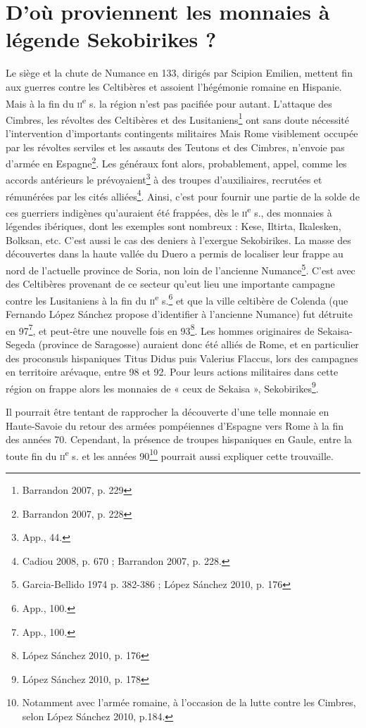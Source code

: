 \documentclass[a4paper,11pt]{article}
\begin{document}
\pagestyle{empty}
\section*{D’où proviennent les monnaies à légende Sekobirikes ?}

Le siège et la chute de Numance en 133, dirigés par Scipion Emilien, mettent fin aux guerres contre 
les Celtibères et assoient l’hégémonie romaine en Hispanie. Mais à la 
fin du \textsc{ii}\textsuperscript{e} s. la région n’est pas pacifiée pour autant.
L’attaque des Cimbres, les révoltes des Celtibères et des Lusitaniens\footnote{Barrandon 2007, p. 229} ont
sans doute nécessité l’intervention d’importants contingents militaires	
Mais Rome visiblement occupée par les révoltes serviles et les assauts des Teutons
et des Cimbres, n’envoie pas d’armée en Espagne\footnote{Barrandon 2007, p. 228}.
Les généraux font alors, probablement, appel, comme les accords antérieurs le prévoyaient\footnote{App., 44.}
à des troupes d’auxiliaires, recrutées et rémunérées par les cités alliées\footnote{Cadiou 2008, p. 670 ; Barrandon 2007, p. 228.
}.
Ainsi, c’est pour fournir une partie de la solde de ces guerriers indigènes qu’auraient été
frappées, dès le \textsc{ii}\textsuperscript{e} s., des monnaies à légendes ibériques, dont les exemples
sont nombreux : Kese, Iltirta, Ikalesken, Bolksan, etc. C’est aussi le cas des
deniers à l’exergue Sekobirikes. La masse des découvertes dans la haute
vallée du Duero a permis de localiser leur frappe au nord de l’actuelle province
de Soria, non loin de l’ancienne Numance\footnote{Garcia-Bellido 1974 p. 382-386 ; López Sánchez 2010, p. 176}.
C’est avec des Celtibères provenant
de ce secteur qu’eut lieu une importante campagne contre les Lusitaniens à
la fin du \textsc{ii}\textsuperscript{e} s.\footnote{App., 100.} et que la ville celtibère de Colenda (que Fernando López
Sánchez propose d’identifier à l’ancienne Numance) fut détruite en 97\footnote{App., 100.}, et
peut-être une nouvelle fois en 93\footnote{López Sánchez 2010, p. 176}.
Les hommes originaires de Sekaisa-Segeda (province de Saragosse) auraient donc été alliés de Rome, et en
particulier des proconsuls hispaniques Titus Didus puis Valerius Flaccus, lors
des campagnes en territoire arévaque, entre 98 et 92. Pour leurs actions
militaires dans cette région on frappe alors les monnaies de « ceux de Sekaisa »,
Sekobirikes\footnote{López Sánchez 2010, p. 178}.

Il pourrait être tentant de rapprocher la découverte d’une telle monnaie en
Haute-Savoie du retour des armées pompéiennes d’Espagne vers Rome à la
fin des années 70. Cependant, la présence de troupes hispaniques en Gaule,
entre la toute fin du \textsc{ii}\textsuperscript{e} s. et les années 90\footnote{Notamment avec l’armée romaine, à l’occasion de la lutte contre les Cimbres, selon López Sánchez 2010,
p.184.} pourrait aussi expliquer cette
trouvaille.
\end{document}
